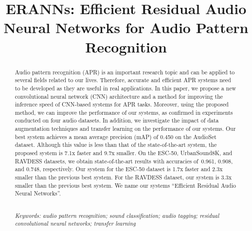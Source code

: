 \documentclass{article}
\title{ERANNs: Efficient Residual Audio Neural Networks for Audio Pattern Recognition}
\begin{document}
\ninept
\maketitle
\begin{sloppy}
\begin{abstract}
Audio pattern recognition (APR) is an important research topic and can be applied to several fields related to our lives. Therefore, accurate and efficient APR systems need to be developed as they are useful in real applications. In this paper, we propose a new convolutional neural network (CNN) architecture and a method for improving the inference speed of CNN-based systems for APR tasks. Moreover, using the proposed method, we can improve the performance of our systems, as confirmed in experiments conducted on four audio datasets. In addition, we investigate the impact of data augmentation techniques and transfer learning on the performance of our systems. Our best system achieves a mean average precision (mAP) of 0.450 on the AudioSet dataset. Although this value is less than that of the state-of-the-art system, the proposed system is 7.1x faster and 9.7x smaller. On the ESC-50, UrbanSound8K, and RAVDESS datasets, we obtain state-of-the-art results with accuracies of~0.961, 0.908, and 0.748, respectively. Our system for the ESC-50 dataset is 1.7x faster and 2.3x smaller than the previous best system. For the RAVDESS dataset, our system is 3.3x smaller than the previous best system. We name our systems ``Efficient Residual Audio Neural Networks''. 


~\\\noindent\textit{Keywords: audio pattern recognition; sound classification; audio tagging; residual convolutional neural networks; transfer learning}
\end{abstract}

    

\end{sloppy}
\end{document}
